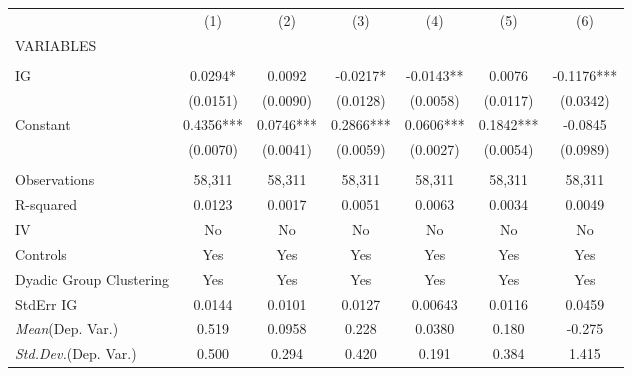 \documentclass[]{article}
\begin{document}
\begin{tabular}{lcccccc} \hline
 & (1) & (2) & (3) & (4) & (5) & (6) \\
VARIABLES &  &  &  &  &  &  \\ \hline
 &  &  &  &  &  &  \\
IG & 0.0294* & 0.0092 & -0.0217* & -0.0143** & 0.0076 & -0.1176*** \\
 & (0.0151) & (0.0090) & (0.0128) & (0.0058) & (0.0117) & (0.0342) \\
Constant & 0.4356*** & 0.0746*** & 0.2866*** & 0.0606*** & 0.1842*** & -0.0845 \\
 & (0.0070) & (0.0041) & (0.0059) & (0.0027) & (0.0054) & (0.0989) \\
 &  &  &  &  &  &  \\
Observations & 58,311 & 58,311 & 58,311 & 58,311 & 58,311 & 58,311 \\
R-squared & 0.0123 & 0.0017 & 0.0051 & 0.0063 & 0.0034 & 0.0049 \\
IV & No & No & No & No & No & No \\
Controls & Yes & Yes & Yes & Yes & Yes & Yes \\
Dyadic Group Clustering & Yes & Yes & Yes & Yes & Yes & Yes \\
StdErr IG & 0.0144 & 0.0101 & 0.0127 & 0.00643 & 0.0116 & 0.0459 \\
\textit{Mean}(Dep. Var.) & 0.519 & 0.0958 & 0.228 & 0.0380 & 0.180 & -0.275 \\
 \textit{Std.Dev.}(Dep. Var.) & 0.500 & 0.294 & 0.420 & 0.191 & 0.384 & 1.415 \\ \hline
\end{tabular}
\end{document}
